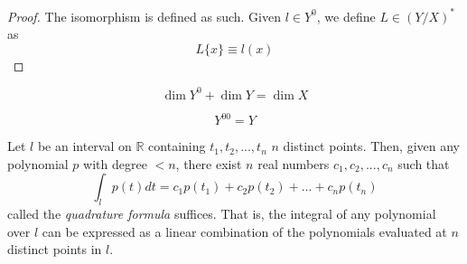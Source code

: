 \documentclass{article}
\begin{document}
    \begin{proof}
      The isomorphism is defined as such. Given $l \in Y^0$, we define $L \in (Y/X)^*$ as 
      \begin{equation}
        L\{x\} \equiv l(x)
      \end{equation}
    \end{proof}

    \begin{corollary}
      \begin{equation}
        \dim Y^0 + \dim Y = \dim X
      \end{equation}
    \end{corollary}

    \begin{corollary}
      \begin{equation}
        Y^{0 0} = Y
      \end{equation}
    \end{corollary}

    \begin{theorem}
      Let $l$ be an interval on $\mathbb{R}$ containing $t_1, t_2, ..., t_n$ $n$ distinct points. Then, given any polynomial $p$ with degree $< n$, there exist $n$ real numbers $c_1, c_2, ..., c_n$ such that
      \begin{equation}
        \int_l p(t) d t = c_1 p(t_1) + c_2 p(t_2) + ... + c_n p(t_n)
      \end{equation}
      called the \textit{quadrature formula} suffices. That is, the integral of any polynomial over $l$ can be expressed as a linear combination of the polynomials evaluated at $n$ distinct points in $l$. 
    \end{theorem}
\end{document}
